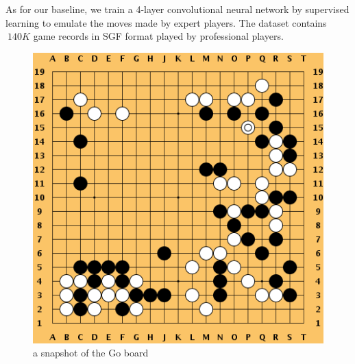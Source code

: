 \documentclass{article}
\begin{document}
As for our baseline, we train a 4-layer convolutional neural network by supervised learning to emulate the moves made by expert players. The dataset \cite{FoxGoServer} contains $~140K$ game records in SGF format played by professional players.
\begin{figure}[H]
\begin{center}
\includegraphics[width=0.5\linewidth]{goboard}
\end{center}
\caption{a snapshot of the Go board}
\label{fig:goboard}
\end{figure}

 

\end{document}
